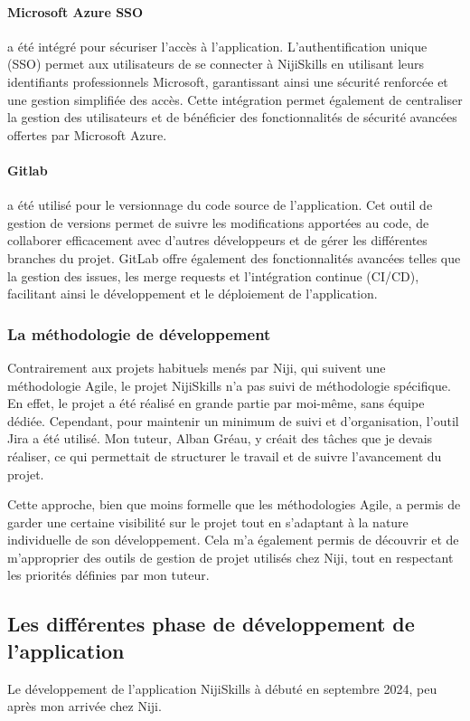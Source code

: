 \documentclass[12pt]{article}
\begin{document}
\paragraph{Microsoft Azure SSO} a été intégré pour sécuriser l'accès à l'application. L'authentification unique (SSO) permet aux utilisateurs de se connecter à NijiSkills en utilisant leurs identifiants professionnels Microsoft, garantissant ainsi une sécurité renforcée et une gestion simplifiée des accès. Cette intégration permet également de centraliser la gestion des utilisateurs et de bénéficier des fonctionnalités de sécurité avancées offertes par Microsoft Azure.

\paragraph{Gitlab} a été utilisé pour le versionnage du code source de l'application. Cet outil de gestion de versions permet de suivre les modifications apportées au code, de collaborer efficacement avec d'autres développeurs et de gérer les différentes branches du projet. GitLab offre également des fonctionnalités avancées telles que la gestion des issues, les merge requests et l'intégration continue (CI/CD), facilitant ainsi le développement et le déploiement de l'application.


\subsubsection{La méthodologie de développement}
Contrairement aux projets habituels menés par Niji, qui suivent une méthodologie Agile, le projet NijiSkills n'a pas suivi de méthodologie spécifique. En effet, le projet a été réalisé en grande partie par moi-même, sans équipe dédiée. Cependant, pour maintenir un minimum de suivi et d'organisation, l'outil Jira a été utilisé. Mon tuteur, Alban Gréau, y créait des tâches que je devais réaliser, ce qui permettait de structurer le travail et de suivre l'avancement du projet.

Cette approche, bien que moins formelle que les méthodologies Agile, a permis de garder une certaine visibilité sur le projet tout en s'adaptant à la nature individuelle de son développement. Cela m'a également permis de découvrir et de m'approprier des outils de gestion de projet utilisés chez Niji, tout en respectant les priorités définies par mon tuteur.

\subsection{Les différentes phase de développement de l'application}
Le développement de l'application NijiSkills à débuté en septembre 2024, peu après mon arrivée chez Niji.
\end{document}
